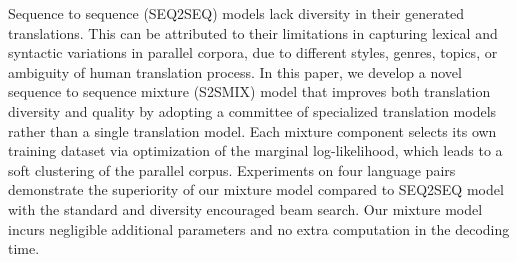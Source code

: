 Sequence to sequence (SEQ2SEQ) models lack diversity in their generated translations. This can be attributed to their limitations in capturing lexical and syntactic variations in parallel corpora, due to different styles, genres, topics, or ambiguity of human translation process. In this paper, we develop a novel sequence to sequence mixture (S2SMIX) model that improves both translation diversity and quality by adopting a committee of specialized translation models rather than a single translation model. Each mixture component selects its own training dataset via optimization of the marginal log-likelihood, which leads to a soft clustering of the parallel corpus. Experiments on four language pairs demonstrate the superiority of our mixture model compared to SEQ2SEQ model with the standard and diversity encouraged beam search. Our mixture model incurs negligible additional parameters and no extra computation in the decoding time.
